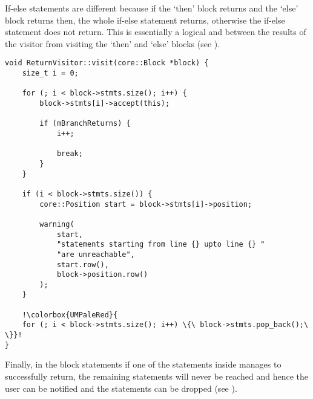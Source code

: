 If-else statements are different because if the `then' block
returns and the `else' block returns then, the whole if-else
statement returns, otherwise the if-else statement does not
return. This is essentially a logical and between the results of
the visitor from visiting the `then' and `else' blocks (see
).

\begin{lstlisting}[escapechar=!, caption={The
\texttt{visit(Block *)} method in the \texttt{ReturnVisitor}
class with the segment pruning statements highlighted
(analysis/ReturnVisitor.cpp).},label=lst:dropinblock]
void ReturnVisitor::visit(core::Block *block) {
    size_t i = 0;

    for (; i < block->stmts.size(); i++) {
        block->stmts[i]->accept(this);

        if (mBranchReturns) {
            i++;

            break;
        }
    }

    if (i < block->stmts.size()) {
        core::Position start = block->stmts[i]->position;

        warning(
            start,
            "statements starting from line {} upto line {} "
            "are unreachable",
            start.row(),
            block->position.row()
        );
    }

    !\colorbox{UMPaleRed}{
    for (; i < block->stmts.size(); i++) \{\ block->stmts.pop_back();\ \}}!
}
\end{lstlisting}

Finally, in the block statements if one of the statements inside
manages to successfully return, the remaining statements will
never be reached and hence the user can be notified and the
statements can be dropped (see ).
